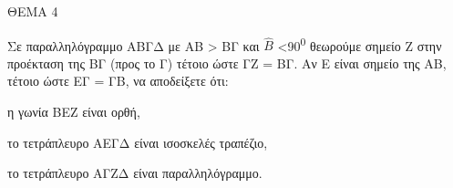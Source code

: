 
ΘΕΜΑ 4

Σε παραλληλόγραμμο ΑΒΓΔ με ΑΒ \textgreater{} ΒΓ και $\widehat{Β}$ \textless90\textsuperscript{0} θεωρούμε σημείο Ζ στην προέκταση της ΒΓ (προς το Γ) τέτοιο ώστε ΓΖ = ΒΓ. Αν Ε είναι σημείο της ΑΒ, τέτοιο ώστε ΕΓ = ΓΒ, να αποδείξετε ότι:

\begin{alist}
\item η γωνία ΒΕΖ είναι ορθή, 

\item το τετράπλευρο ΑΕΓΔ είναι ισοσκελές τραπέζιο, 

\item το τετράπλευρο ΑΓΖΔ είναι παραλληλόγραμμο. 
\end{alist}
